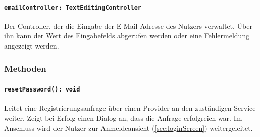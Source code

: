 \documentclass{entwurfsheft}
\begin{document}
\begin{sloppypar}
\paragraph{\texttt{emailController: TextEditingController}}
Der Controller, der die Eingabe der E-Mail-Ad\-resse des Nutzers verwaltet. Über ihn kann der Wert des Eingabefelds abgerufen werden oder eine Fehlermeldung angezeigt werden.

\subsubsection*{Methoden}
\paragraph{\texttt{resetPassword(): void}}
Leitet eine Registrierungsanfrage über einen Provider an den zuständigen Service weiter. Zeigt bei Erfolg einen \Gls{Dialog} an, dass die Anfrage erfolgreich war. Im Anschluss wird der Nutzer zur Anmeldeansicht (\ref{sec:loginScreen}) weitergeleitet.
\newpage


\end{sloppypar}
\end{document}
